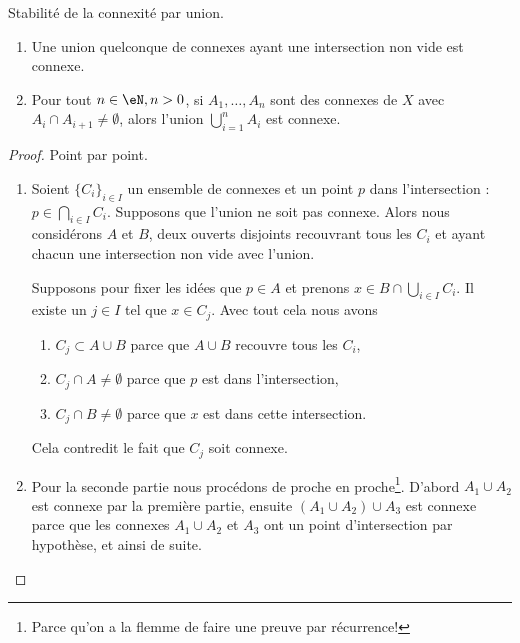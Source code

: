 \begin{proposition} \label{PropIWIDzzH}
	Stabilité de la connexité par union.
	\begin{enumerate}
		\item       \label{ITEMooLVSSooTGstBz}
		      Une union quelconque de connexes ayant une intersection non vide est connexe.
		\item
		      Pour tout \( n \in \eN, n > 0 \), si \( A_1,\ldots, A_n\) sont des connexes de \( X\) avec \( A_i\cap A_{i+1}\neq \emptyset\), alors l'union \( \bigcup_{i=1}^nA_i\) est connexe.
	\end{enumerate}
\end{proposition}

\begin{proof}
	Point par point.
	\begin{enumerate}
		\item
		      Soient \( \{ C_i \}_{i\in I}\) un ensemble de connexes et un point \( p\) dans l'intersection : \( p\in\bigcap_{i\in I}C_i\). Supposons que l'union ne soit pas connexe. Alors nous considérons \( A\) et \( B\), deux ouverts disjoints recouvrant tous les \( C_i\) et ayant chacun une intersection non vide avec l'union.

		      Supposons pour fixer les idées que \( p\in A\) et prenons \( x\in B\cap\bigcup_{i\in I}C_i\). Il existe un \( j\in I\) tel que \( x\in C_j\). Avec tout cela nous avons
		      \begin{enumerate}
			      \item
			            \( C_j\subset A\cup B\) parce que \(A \cup B\) recouvre tous les \( C_i \),
			      \item
			            \( C_j\cap A\neq \emptyset\) parce que \( p\) est dans l'intersection,
			      \item
			            \( C_j\cap B\neq\emptyset\) parce que \( x\) est dans cette intersection.
		      \end{enumerate}
		      Cela contredit le fait que \( C_j\) soit connexe.

		\item

		      Pour la seconde partie nous procédons de proche en proche\footnote{Parce qu'on a la flemme de faire une preuve par récurrence!}. D'abord \( A_1\cup A_2\) est connexe par la première partie, ensuite \( (A_1\cup A_2)\cup A_3\) est connexe parce que les connexes \( A_1\cup A_2\) et \( A_3\) ont un point d'intersection par hypothèse, et ainsi de suite.
	\end{enumerate}
\end{proof}


